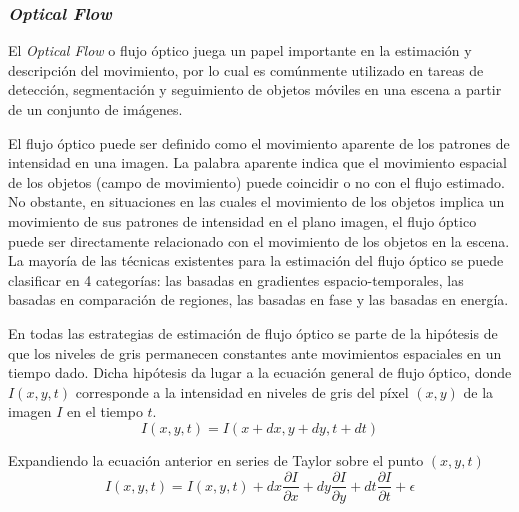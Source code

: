 \subsubsection{\textit{Optical Flow}}
El \emph{Optical Flow} o flujo óptico juega un papel importante en la estimación y descripción del movimiento, por lo cual es comúnmente utilizado en tareas de detección, segmentación y seguimiento de objetos móviles en una escena a partir de un conjunto de imágenes. 

El flujo óptico puede ser definido como el movimiento aparente de los patrones de intensidad en una imagen. La palabra aparente indica que el movimiento espacial de los objetos (campo de movimiento) puede coincidir o no con el flujo estimado. No obstante, en situaciones en las cuales el movimiento de los objetos implica un movimiento de sus patrones de intensidad en el plano imagen, el flujo óptico puede ser directamente relacionado con el movimiento de los objetos en la escena. La mayoría de las técnicas existentes para la estimación del flujo óptico se puede clasificar en 4 categorías: las basadas en gradientes espacio-temporales, las basadas en comparación de regiones, las basadas en fase y las basadas en energía.

En todas las estrategias de estimación de flujo óptico se parte de la hipótesis de que los niveles de gris permanecen constantes ante movimientos espaciales en un tiempo dado. Dicha hipótesis da lugar a la ecuación general de flujo óptico, donde $I(x, y, t)$ corresponde a la intensidad en niveles de gris del píxel $(x,y)$ de la imagen $I$ en el tiempo $t$. 
\begin{equation}
  I(x,y,t) = I(x+dx,y+dy,t+dt)
\end{equation}

Expandiendo la ecuación anterior en series de Taylor sobre el punto $(x,y,t)$
\begin{equation}
  I(x,y,t) = I(x,y,t) + dx \frac{\partial I}{\partial x}+dy\frac{\partial I}{\partial y} + dt \frac{\partial I}{\partial t} + \epsilon
\end{equation}


